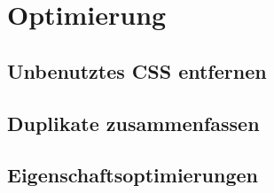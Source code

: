 \section{Optimierung}

\subsection{Unbenutztes CSS entfernen}
\label{unused_css_delete}

\subsection{Duplikate zusammenfassen}

\subsection{Eigenschaftsoptimierungen}

\subsection{}